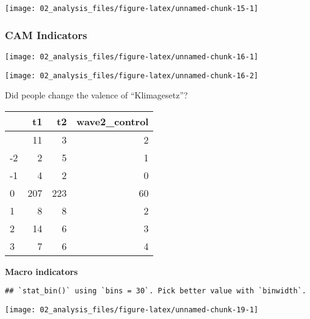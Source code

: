 \documentclass[
]{article}
\begin{document}
\begin{center}\texttt{[image: 02\_analysis\_files/figure-latex/unnamed-chunk-15-1]} \end{center}

\hypertarget{cam-indicators}{%
\subsubsection{CAM Indicators}\label{cam-indicators}}

\begin{center}\texttt{[image: 02\_analysis\_files/figure-latex/unnamed-chunk-16-1]} \end{center}

\begin{center}\texttt{[image: 02\_analysis\_files/figure-latex/unnamed-chunk-16-2]} \end{center}

Did people change the valence of ``Klimagesetz''?

\begin{longtable}[]{@{}lrrr@{}}
\toprule\noalign{}
& t1 & t2 & wave2\_control \\
\midrule\noalign{}
\endhead
\bottomrule\noalign{}
\endlastfoot
-3 & 11 & 3 & 2 \\
-2 & 2 & 5 & 1 \\
-1 & 4 & 2 & 0 \\
0 & 207 & 223 & 60 \\
1 & 8 & 8 & 2 \\
2 & 14 & 6 & 3 \\
3 & 7 & 6 & 4 \\
\end{longtable}

\textbf{Macro indicators}

\begin{verbatim}
## `stat_bin()` using `bins = 30`. Pick better value with `binwidth`.
\end{verbatim}

\begin{center}\texttt{[image: 02\_analysis\_files/figure-latex/unnamed-chunk-19-1]} \end{center}
\end{document}
